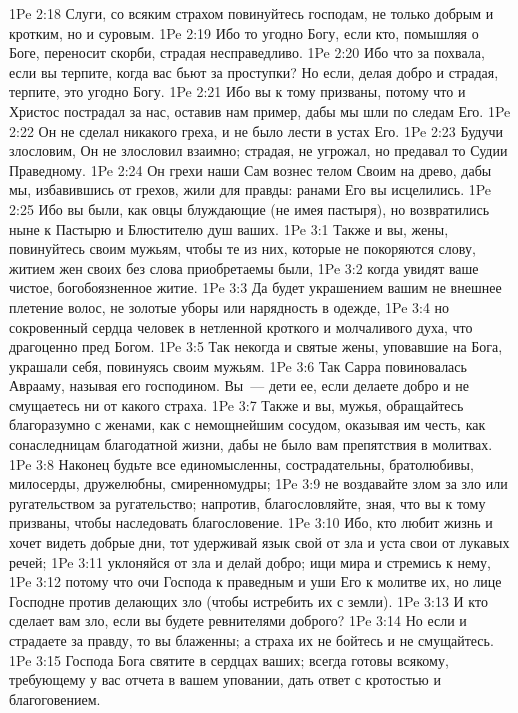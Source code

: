 \rsbpar\vs 1Pe 2:18 Слуги, со всяким страхом повинуйтесь господам, не только добрым и кротким, но и суровым.
\vs 1Pe 2:19 Ибо то угодно Богу, если кто, помышляя о Боге, переносит скорби, страдая несправедливо.
\vs 1Pe 2:20 Ибо что за похвала, если вы терпите, когда вас бьют за проступки? Но если, делая добро и страдая, терпите, это угодно Богу.
\vs 1Pe 2:21 Ибо вы к тому призваны, потому что и Христос пострадал за нас, оставив нам пример, дабы мы шли по следам Его.
\vs 1Pe 2:22 Он не сделал никакого греха, и не было лести в устах Его.
\vs 1Pe 2:23 Будучи злословим, Он не злословил взаимно; страдая, не угрожал, но предавал то Судии Праведному.
\vs 1Pe 2:24 Он грехи наши Сам вознес телом Своим на древо, дабы мы, избавившись от грехов, жили для правды: ранами Его вы исцелились.
\vs 1Pe 2:25 Ибо вы были, как овцы блуждающие (не имея пастыря), но возвратились ныне к Пастырю и Блюстителю душ ваших.
\vs 1Pe 3:1 Также и вы, жены, повинуйтесь своим мужьям, чтобы те из них, которые не покоряются слову, житием жен своих без слова приобретаемы были,
\vs 1Pe 3:2 когда увидят ваше чистое, богобоязненное житие.
\vs 1Pe 3:3 Да будет украшением вашим не внешнее плетение волос, не золотые уборы или нарядность в одежде,
\vs 1Pe 3:4 но сокровенный сердца человек в нетленной  кроткого и молчаливого духа, что драгоценно пред Богом.
\vs 1Pe 3:5 Так некогда и святые жены, уповавшие на Бога, украшали себя, повинуясь своим мужьям.
\vs 1Pe 3:6 Так Сарра повиновалась Аврааму, называя его господином. Вы~--- дети ее, если делаете добро и не смущаетесь ни от какого страха.
\rsbpar\vs 1Pe 3:7 Также и вы, мужья, обращайтесь благоразумно с женами, как с немощнейшим сосудом, оказывая им честь, как сонаследницам благодатной жизни, дабы не было вам препятствия в молитвах.
\rsbpar\vs 1Pe 3:8 Наконец будьте все единомысленны, сострадательны, братолюбивы, милосерды, дружелюбны, смиренномудры;
\vs 1Pe 3:9 не воздавайте злом за зло или ругательством за ругательство; напротив, благословляйте, зная, что вы к тому призваны, чтобы наследовать благословение.
\vs 1Pe 3:10 Ибо, кто любит жизнь и хочет видеть добрые дни, тот удерживай язык свой от зла и уста свои от лукавых речей;
\vs 1Pe 3:11 уклоняйся от зла и делай добро; ищи мира и стремись к нему,
\vs 1Pe 3:12 потому что очи Господа  к праведным и уши Его к молитве их, но лице Господне против делающих зло (чтобы истребить их с земли).
\vs 1Pe 3:13 И кто сделает вам зло, если вы будете ревнителями доброго?
\vs 1Pe 3:14 Но если и страдаете за правду, то вы блаженны; а страха их не бойтесь и не смущайтесь.
\rsbpar\vs 1Pe 3:15 Господа Бога святите в сердцах ваших;  всегда готовы всякому, требующему у вас отчета в вашем уповании, дать ответ с кротостью и благоговением.
